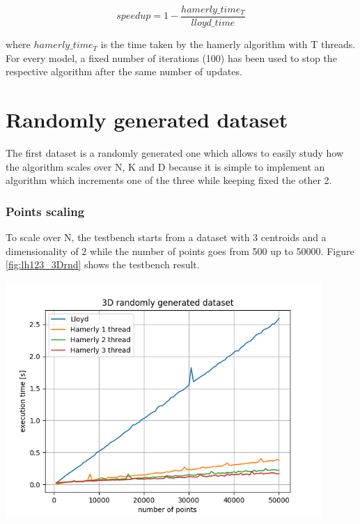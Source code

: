 \documentclass{report}
\begin{document}
\begin{minipage}[b]{0.48\textwidth}
  \begin{equation}
    speedup = 1 - \frac{hamerly\_time_T}{lloyd\_time}
  \end{equation}

  where $hamerly\_time_T$ is the time taken by the hamerly algorithm with T threads. For every model, a fixed number of iterations (100) has been used to stop the respective algorithm after the same number of updates.
  
  \section*{Randomly generated dataset }
  The first dataset is a randomly generated one which allows to easily study how the algorithm scales over N, K and D because it is simple to implement an algorithm which increments one of the three while keeping fixed the other 2.

  \subsubsection*{Points scaling}
  To scale over N, the testbench starts from a dataset with 3 centroids and a dimensionality of 2 while the number of points goes from 500 up to 50000. Figure \ref{fig:lh123_3Drnd} shows the testbench result.

  \begin{center} 
    \includegraphics[width = 0.9\textwidth]{imgs/lh123_3Drnd.png}
    \label{fig:lh123_3Drnd}
  \end{center}


\end{minipage}
\end{document}
